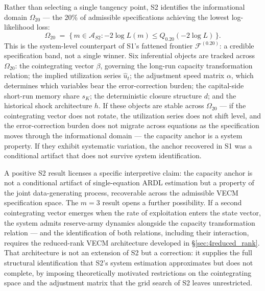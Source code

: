 \documentclass[11pt,a4paper]{article}
\begin{document}
Rather than selecting a single tangency point, S2 identifies the
informational domain $\Omega_{20}$ --- the 20\% of admissible specifications
achieving the lowest log-likelihood loss:
%
\begin{equation}
	\label{eq:S2_omega20}
	\Omega_{20} \;=\;
	\bigl\{\, m \in \mathcal{A}_{S2} :
	{-2\log L}(m) \leq Q_{0.20}({-2\log L})
	\,\bigr\}.
\end{equation}
%
This is the system-level counterpart of S1's fattened frontier
$\mathcal{F}^{(0.20)}$: a credible specification band, not a single winner.
Six inferential objects are tracked across $\Omega_{20}$: the cointegrating
vector $\beta$, governing the long-run capacity transformation relation; the
implied utilization series $\widehat{u}_t$; the adjustment speed matrix
$\alpha$, which determines which variables bear the error-correction burden;
the capital-side short-run memory share $s_K$; the deterministic closure
structure $d$; and the historical shock architecture $h$. If these objects
are stable across $\Omega_{20}$ --- if the cointegrating vector does not
rotate, the utilization series does not shift level, and the
error-correction burden does not migrate across equations as the
specification moves through the informational domain --- the capacity anchor
is a system property. If they exhibit systematic variation, the anchor
recovered in S1 was a conditional artifact that does not survive system
identification.


A positive S2 result licenses a specific interpretive claim: the capacity
anchor is not a conditional artifact of single-equation ARDL estimation but a
property of the joint data-generating process, recoverable across the
admissible VECM specification space. The $m = 3$ result opens a further
possibility. If a second cointegrating vector emerges when the rate of
exploitation enters the state vector, the system admits reserve-army dynamics
alongside the capacity transformation relation --- and the identification of
both relations, including their interaction, requires the reduced-rank VECM
architecture developed in \S\ref{sec:4reduced_rank}. That architecture is not an
extension of S2 but a correction: it supplies the full structural
identification that S2's system estimation approximates but does not
complete, by imposing theoretically motivated restrictions on the
cointegrating space and the adjustment matrix that the grid search of S2
leaves unrestricted.
\end{document}
